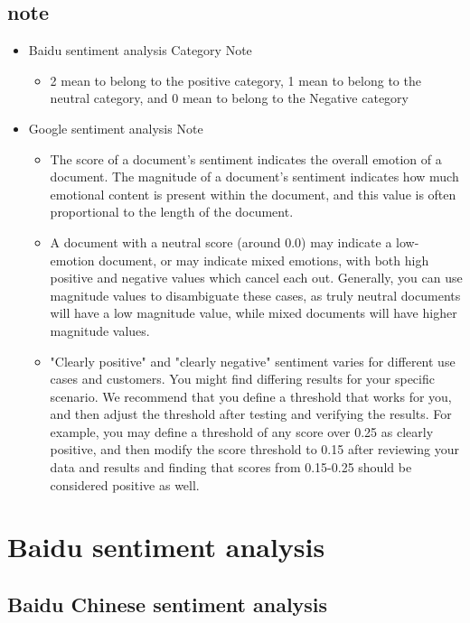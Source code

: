\subsection{note}
\label{sec:orgbc09a97}
\begin{itemize}
\item Baidu sentiment analysis Category Note
\begin{itemize}
\item 2 mean to belong to the positive category, 1 mean to belong to the neutral category, and 0 mean to belong to the Negative category
\end{itemize}
\item Google sentiment analysis Note
\begin{itemize}
\item The score of a document's sentiment indicates the overall emotion of a document. The magnitude of a document's sentiment indicates how much emotional content is present within the document, and this value is often proportional to the length of the document.
\item A document with a neutral score (around 0.0) may indicate a low-emotion document, or may indicate mixed emotions, with both high positive and negative values which cancel each out. Generally, you can use magnitude values to disambiguate these cases, as truly neutral documents will have a low magnitude value, while mixed documents will have higher magnitude values.
\item "Clearly positive" and "clearly negative" sentiment varies for different use cases and customers. You might find differing results for your specific scenario. We recommend that you define a threshold that works for you, and then adjust the threshold after testing and verifying the results. For example, you may define a threshold of any score over 0.25 as clearly positive, and then modify the score threshold to 0.15 after reviewing your data and results and finding that scores from 0.15-0.25 should be considered positive as well.
\end{itemize}
\end{itemize}

\section{Baidu sentiment analysis}
\label{sec:org850032d}
\subsection{Baidu Chinese sentiment analysis}
\label{sec:org6947fd1}
